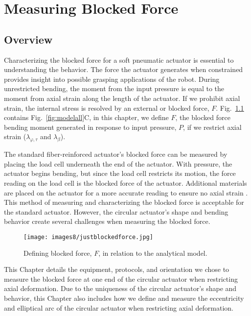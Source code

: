 \chapter{Measuring Blocked Force}
\label{chapter:blockedforce}

\section{Overview}
Characterizing the blocked force for a soft pneumatic actuator is essential to understanding the behavior. The force the actuator generates when constrained provides insight into possible grasping applications of the robot. During unrestricted bending, the moment from the input pressure is equal to the moment from axial strain along the length of the actuator. If we prohibit axial strain, the internal stress is resolved by an external or blocked force, $F$. Fig.~\ref{fig:justblockedforce} contains Fig.~\ref{fig:modelall}C, in this chapter, we define $F$, the blocked force bending moment generated in response to input pressure, $P$, if we restrict axial strain ($\lambda_{\varphi,\tau}$ and $\lambda_\beta$). 

\clearpage
The standard fiber-reinforced actuator's blocked force can be measured by placing the load cell underneath the end of the actuator. With pressure, the actuator begins bending, but since the load cell restricts its motion, the force reading on the load cell is the blocked force of the actuator. Additional materials are placed on the actuator for a more accurate reading to ensure no axial strain \cite{polygerinos_modeling_2015}. This method of measuring and characterizing the blocked force is acceptable for the standard actuator. However, the circular actuator's shape and bending behavior create several challenges when measuring the blocked force. 

\begin{figure}[!ht]
    \centering
     \texttt{[image: images8/justblockedforce.jpg]}
    \caption{Defining blocked force, $F$, in relation to the analytical model.}
    \label{fig:justblockedforce}
\end{figure}

This Chapter details the equipment, protocols, and orientation we chose to measure the blocked force at one end of the circular actuator when restricting axial deformation. Due to the uniqueness of the circular actuator's shape and behavior, this Chapter also includes how we define and measure the eccentricity and elliptical arc of the circular actuator when restricting axial deformation. 

